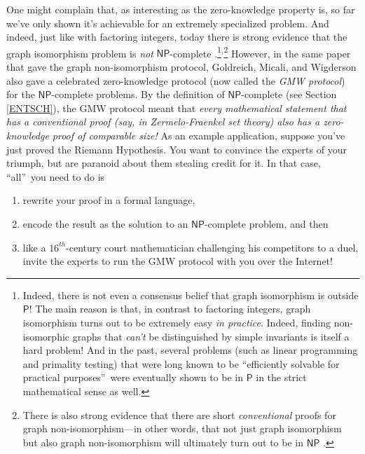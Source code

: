 \documentclass[12pt,onecolumn]{article}%
\begin{document}
One might complain that, as interesting as the zero-knowledge property is, so
far we've only shown it's achievable for an extremely specialized problem.
 And indeed, just like with factoring integers, today there is strong
evidence that the graph isomorphism problem is \textit{not} $\mathsf{NP}%
$-complete \cite{bhz}.\footnote{Indeed, there is not even a consensus belief
that graph isomorphism is outside $\mathsf{P}$! The main reason is that, in
contrast to factoring integers, graph isomorphism turns out to be extremely
easy \textit{in practice}. Indeed, finding non-isomorphic graphs that
\textit{can't} be distinguished by simple invariants is itself a hard problem!
 And in the past, several problems (such as linear programming and primality
testing) that were long known to be \textquotedblleft efficiently solvable for
practical purposes\textquotedblright\  were eventually shown to be
in $\mathsf{P}$ in the strict mathematical sense as well.}$^{,}%
$\footnote{There is also strong evidence that there are short
\textit{conventional} proofs for graph non-isomorphism---in other words, that
not just graph isomorphism but also graph non-isomorphism will ultimately turn
out to be in $\mathsf{NP}$ \cite{kvm}.} However, in the same paper that gave
the graph non-isomorphism protocol, Goldreich, Micali, and Wigderson
\cite{gmw} also gave a celebrated zero-knowledge protocol (now called the
\textit{GMW protocol}) for the $\mathsf{NP}$-complete problems. By the
definition of $\mathsf{NP}$-complete (see Section \ref{ENTSCH}), the GMW
protocol meant that \textit{every mathematical statement that has a
conventional proof (say, in Zermelo-Fraenkel set theory) also has a
zero-knowledge proof of comparable size!} As an example application, suppose
you've just proved the Riemann Hypothesis. You want to convince the experts
of your triumph, but are paranoid about them stealing credit for it. In that
case, \textquotedblleft all\textquotedblright\  you need to do is

\begin{enumerate}
\item[(1)] rewrite your proof in a formal language,

\item[(2)] encode the result as the solution to an $\mathsf{NP}$-complete
problem, and then

\item[(3)] like a $16^{th}$-century court mathematician challenging his
competitors to a duel, invite the experts to run the GMW protocol with you
over the Internet!
\end{enumerate}
\end{document}
